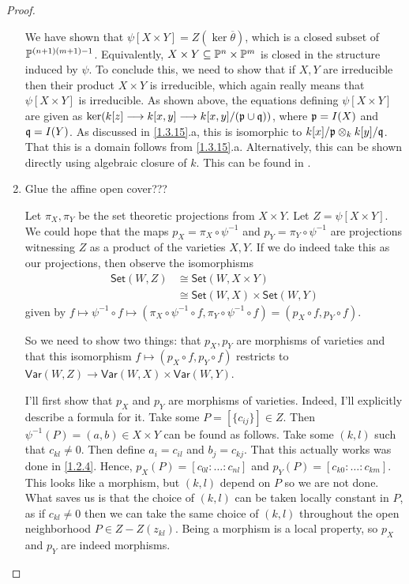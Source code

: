 \begin{proof}
\begin{enumerate}[label = (\alph*)]
        We have shown that $\psi[X \times Y] = Z(\ker \overline \theta)$, which is a closed subset of $\P^{(n + 1)(m + 1) - 1}$. Equivalently, $X \times Y \subseteq \P^n \times \P^m$ is closed in the structure induced by $\psi$. To conclude this, we need to show that if $X, Y$ are irreducible then their product $X \times Y$ is irreducible, which again really means that $\psi[X \times Y]$ is irreducible. As shown above, the equations defining $\psi[X \times Y]$ are given as $\ker(k[z] \longrightarrow k[x, y] \longrightarrow k[x, y]/(\p \cup \q))$, where $\p = I(X)$ and $\q = I(Y)$. As discussed in \ref{1.3.15}.a, this is isomorphic to $k[x]/\p \otimes_k k[y]/\q$. That this is a domain follows from \ref{1.3.15}.a. Alternatively, this can be shown directly using algebraic closure of $k$. This can be found in \cite[Ch. 5 \S 17.5 Cor. 3]{bourbaki-algebra2}. 

        \item Glue the affine open cover???

        Let $\pi_X, \pi_Y$ be the set theoretic projections from $X \times Y$. Let $Z = \psi[X \times Y]$. We could hope that the maps $p_X = \pi_X \circ \psi^{-1}$ and $p_Y = \pi_Y \circ \psi^{-1}$ are projections witnessing $Z$ as a product of the varieties $X, Y$. If we do indeed take this as our projections, then observe the isomorphisms
        \begin{align*}
            \mathsf{Set}(W, Z) &\cong \mathsf{Set}(W, X \times Y)\\
            &\cong \mathsf{Set}(W, X) \times \mathsf{Set}(W, Y)
        \end{align*}
        given by $f \mapsto \psi^{-1} \circ f \mapsto (\pi_X \circ \psi^{-1} \circ f, \pi_Y \circ \psi^{-1} \circ f) = (p_X \circ f, p_Y \circ f)$.

        So we need to show two things: that $p_X, p_Y$ are morphisms of varieties and that this isomorphism $f \mapsto (p_X \circ f, p_Y \circ f)$ restricts to $\mathsf{Var}(W, Z) \longrightarrow \mathsf{Var}(W, X) \times \mathsf{Var}(W, Y)$.

        I'll first show that $p_X$ and $p_Y$ are morphisms of varieties. Indeed, I'll explicitly describe a formula for it. Take some $P = [\{c_{ij}\}] \in Z$. Then $\psi^{-1}(P) = (a, b) \in X \times Y$ can be found as follows. Take some $(k, l)$ such that $c_{kl} \neq 0$. Then define $a_{i} = c_{il}$ and $b_j = c_{kj}$. That this actually works was done in \ref{1.2.4}. Hence, $p_X(P) = [c_{0l} : \dots : c_{nl}]$ and $p_Y(P) = [c_{k0} : \dots : c_{k m}]$. This looks like a morphism, but $(k, l)$ depend on $P$ so we are not done. What saves us is that the choice of $(k, l)$ can be taken locally constant in $P$, as if $c_{kl} \neq 0$ then we can take the same choice of $(k, l)$ throughout the open neighborhood $P \in Z - Z(z_{kl})$. Being a morphism is a local property, so $p_X$ and $p_Y$ are indeed morphisms.


\end{enumerate}
\end{proof}
